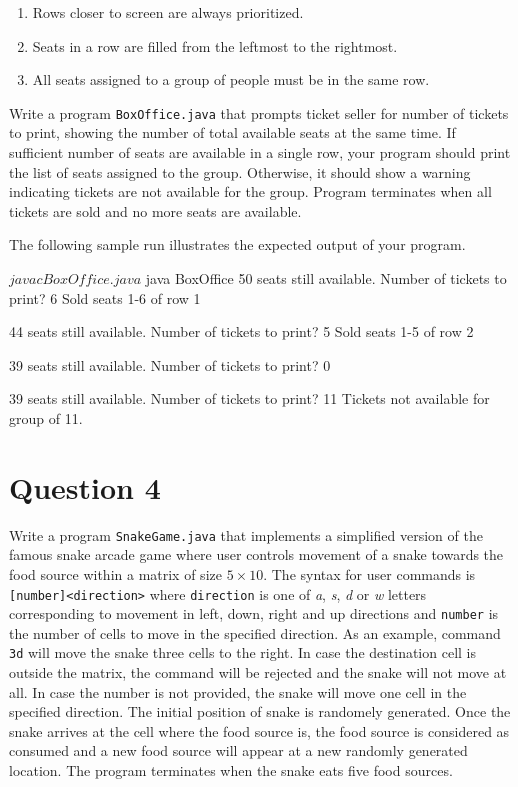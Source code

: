 \documentclass[12pt,letterpaper,twoside]{article}
\begin{document}
\begin{enumerate}[itemsep=0mm,rightmargin=\leftmargin]
  \item Rows closer to screen are always prioritized.
  \item Seats in a row are filled from the leftmost to the rightmost.
  \item All seats assigned to a group of people must be in the same row.
\end{enumerate}

Write a program \texttt{BoxOffice.java} that prompts ticket seller for number of tickets to print, showing the number of total available seats at the same time.
If sufficient number of seats are available in a single row, your program should print the list of seats assigned to the group.
Otherwise, it should show a warning indicating tickets are not available for the group.
Program terminates when all tickets are sold and no more seats are available.

The following sample run illustrates the expected output of your program.

\begin{terminal}
$ javac BoxOffice.java
$ java BoxOffice
50 seats still available.
Number of tickets to print? 6
Sold seats 1-6 of row 1

44 seats still available.
Number of tickets to print? 5
Sold seats 1-5 of row 2

39 seats still available.
Number of tickets to print? 0

39 seats still available.
Number of tickets to print? 11
Tickets not available for group of 11.
\end{terminal}

\section*{Question 4}

Write a program \texttt{SnakeGame.java} that implements a simplified version of the famous snake arcade game where user controls movement of a snake towards the food source within a matrix of size $5 \times 10$.
The syntax for user commands is \texttt{[number]<direction>} where \texttt{direction} is one of \textit{a}, \textit{s}, \textit{d} or \textit{w} letters corresponding to movement in left, down, right and up directions and \texttt{number} is the number of cells to move in the specified direction. As an example, command \texttt{3d} will move the snake three cells to the right.
In case the destination cell is outside the matrix, the command will be rejected and the snake will not move at all.
In case the number is not provided, the snake will move one cell in the specified direction.
The initial position of snake is randomely generated.
Once the snake arrives at the cell where the food source is, the food source is considered as consumed and a new food source will appear at a new randomly generated location.
The program terminates when the snake eats five food sources.
\end{document}
